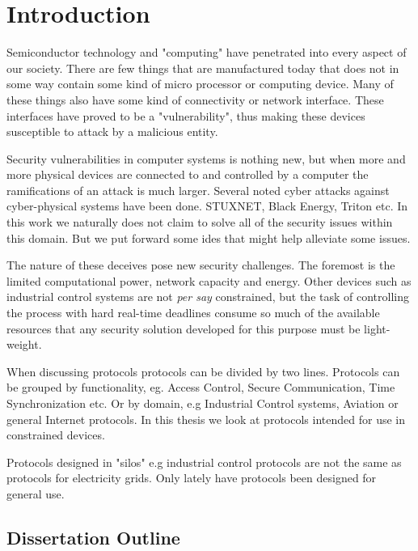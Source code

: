 \chapter{Introduction}
Semiconductor technology and "computing" have penetrated into every aspect of our society. There are few things that are manufactured today that does not in some way contain some kind of micro processor or computing device. Many of these things also have some kind of connectivity or network interface. These interfaces have proved to be a "vulnerability", thus making these devices susceptible to attack by a malicious entity.

Security vulnerabilities in computer systems is nothing new, but when more and more physical devices are connected to and controlled by a computer the ramifications of an attack is much larger.
Several noted cyber attacks against cyber-physical systems have been done. STUXNET, Black Energy, Triton etc.
In this work we naturally does not claim to solve all of the security issues within this domain. But we put forward some ides that might help alleviate some issues.

The nature of these deceives pose new security challenges. The foremost is the limited computational power, network capacity and energy. 
Other devices such as industrial control systems are not \emph{per say} constrained, but the task of controlling the process with hard real-time deadlines consume so much of the available resources that any security solution developed for this purpose must be light-weight. 

When discussing protocols protocols can be divided by two lines. Protocols can be grouped by functionality, eg. Access Control, Secure Communication, Time Synchronization etc. Or by domain, e.g Industrial Control systems, Aviation or general Internet protocols. 
In this thesis we look at protocols intended for use in constrained devices. 

Protocols designed in "silos" e.g industrial control protocols are not the same as protocols for electricity grids. 
Only lately have protocols been designed for general use. 



\section{Dissertation Outline}

